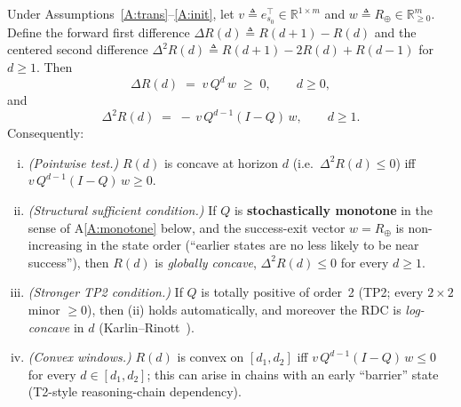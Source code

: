 \begin{proposition}
\label{thm:shape}
Under Assumptions~\ref{A:trans}--\ref{A:init}, let
$v\triangleq e_{s_0}^\top\in\mathbb{R}^{1\times m}$ and
$w\triangleq R_\oplus\in\mathbb{R}^{m}_{\ge 0}$. Define the forward first
difference $\Delta R(d)\triangleq R(d+1)-R(d)$ and the centered second
difference $\Delta^{2}R(d)\triangleq R(d+1)-2R(d)+R(d-1)$ for $d\ge 1$.
Then
\begin{equation}
\Delta R(d) \;=\; v\,Q^{d}\,w \;\ge\; 0, \qquad d\ge 0,
\label{eq:t4-1stdiff}
\end{equation}
and
\begin{equation}
\boxed{\;
\Delta^{2}R(d)
   \;=\; -\,v\,Q^{d-1}(I-Q)\,w,
   \qquad d\ge 1.\;}
\label{eq:t4-2nddiff}
\end{equation}
Consequently:
\begin{enumerate}[(i)]
  \item \emph{(Pointwise test.)} $R(d)$ is concave at horizon $d$
        (i.e.\ $\Delta^{2}R(d)\le 0$) iff
        $v\,Q^{d-1}(I-Q)\,w\ge 0$.
  \item \emph{(Structural sufficient condition.)}
        If $Q$ is \textbf{stochastically monotone} in the sense of
        A\ref{A:monotone} below, and the success-exit vector $w=R_\oplus$
        is non-increasing in the state order (``earlier states are no
        less likely to be near success''), then $R(d)$ is
        \emph{globally concave}, $\Delta^{2}R(d)\le 0$ for every $d\ge 1$.
  \item \emph{(Stronger TP2 condition.)} If $Q$ is totally positive of
        order~2 (TP2; every $2\times2$ minor $\ge 0$), then (ii) holds
        automatically, and moreover the RDC is \emph{log-concave} in $d$
        (Karlin--Rinott~\cite{karlin1980tp2}).
  \item \emph{(Convex windows.)} $R(d)$ is convex on $[d_1,d_2]$ iff
        $v\,Q^{d-1}(I-Q)\,w\le 0$ for every $d\in[d_1,d_2]$; this can
        arise in chains with an early ``barrier'' state (T2-style
        reasoning-chain dependency).
\end{enumerate}
\end{proposition}

